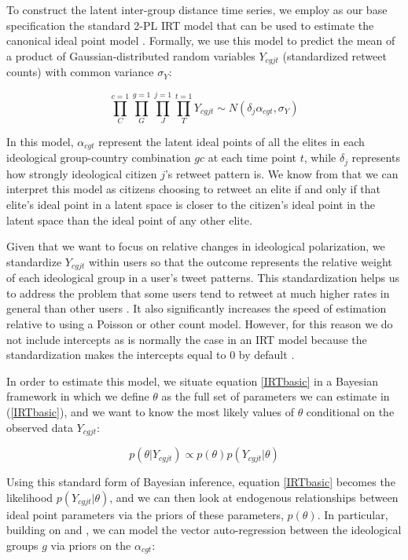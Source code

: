 \documentclass[12pt]{article}
\begin{document}
To construct the latent inter-group distance time series, we employ as our base specification the standard 2-PL IRT model that can be used to estimate the canonical ideal point model  \parencite{jackman2004}. Formally, we use this model to predict the mean of a product of Gaussian-distributed random variables $Y_{cgjt}$ (standardized retweet counts) with common variance $\sigma_Y$:

\begin{equation}\label{IRTbasic}
\prod^{c=1}_C \prod^{g=1}_G \prod^{j=1}_J \prod^{t=1}_T Y_{cgjt} \sim N( \delta_j  \alpha_{cgt},\sigma_{Y})
\end{equation}

In this model, $\alpha_{cgt}$ represent the latent ideal points of all the elites in each ideological group-country combination $gc$ at each time point $t$, while $\delta_j$ represents how strongly ideological citizen $j$'s retweet pattern is. We know from \textcite{jackman2004} that we can interpret this model as citizens choosing to retweet an elite if and only if that elite's ideal point in a latent space is closer to the citizen's ideal point in the latent space than the ideal point of any other elite. 

Given that we want to focus on relative changes in ideological polarization, we standardize $Y_{cgjt}$ within users so that the outcome represents the relative weight of each ideological group in a user's tweet patterns. This standardization helps us to address the problem that some users tend to retweet at much higher rates in general than other users \parencite{barbera2015}. It also significantly increases the speed of estimation relative to using a Poisson or other count model. However, for this reason we do not include intercepts as is normally the case in an IRT model because the standardization makes the intercepts equal to 0 by default \parencite{kropko2013}.

In order to estimate this model, we situate equation \ref{IRTbasic} in a Bayesian framework in which we define $\theta$ as the full set of parameters we can estimate in (\ref{IRTbasic}), and we want to know the most likely values of $\theta$ conditional on the observed data $Y_{cgjt}$:

\begin{equation}
p(\theta|Y_{cgjt}) \propto p(\theta)p(Y_{cgjt}|\theta)
\end{equation}

Using this standard form of Bayesian inference, equation \ref{IRTbasic} becomes the likelihood $p(Y_{cgjt}|\theta)$, and we can then look at endogenous relationships between ideal point parameters via the priors of these parameters, $p(\theta)$. In particular, building on \textcite{quinn2002} and \textcite{kropko2013}, we can model the vector auto-regression between the ideological groups $g$ via priors on the $\alpha_{cgt}$:
\end{document}
